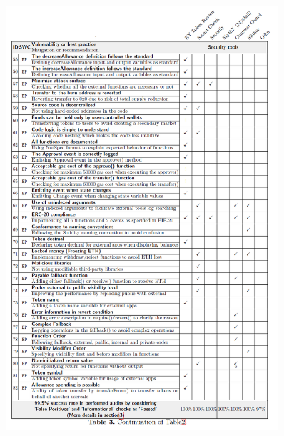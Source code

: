 \begin{figure}[t!]
	\centering
	\includegraphics[width=0.9\textwidth]{figures/table3.png}
\end{figure}

